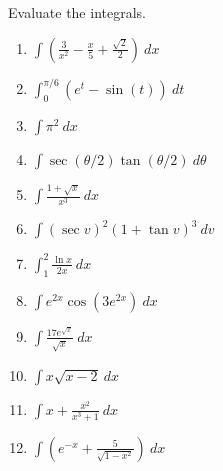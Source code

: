 \documentclass[12pt]{article}
\newcommand{\ds}{\displaystyle}
\begin{document}
Evaluate the integrals. %
\begin{enumerate}
\item $\ds \int \left(\frac{3}{x^2}-\frac{x}{5}+\frac{\sqrt{2}}{2} \right) \ dx $ \vfill
\item $\ds \int_0^{\pi/6} \left(e^t-\sin(t)\right) \ dt $ \vfill
\item $\ds \int \pi^2 \ dx $\vfill
\newpage
\item $\ds \int \sec(\theta/2) \tan(\theta/2)\ d\theta $\vfill
\item $\ds \int \frac{1+\sqrt{x}}{x^3}\ dx $\vfill
\item $\ds \int (\sec v)^{2} (1+\tan{v})^3\ dv $ \vfill

\newpage
\item $\ds \int_1^2 \frac{\ln x}{2x}\ dx $ \vfill
\item $\ds \int e^{2x}\cos(3e^{2x})\ dx $ \vfill
\item $\ds \int  \frac{17e^{\sqrt{x}}}{\sqrt{x}} \ dx $  \vfill
\newpage
\item $\ds \int x\sqrt{x-2}\ dx $ \vfill
\item $\ds \int x+ \frac{x^2}{x^3+1}\ dx $ \vfill
\item $\ds \int \left( e^{-x}+\frac{5}{\sqrt{1-x^2}} \right)\ dx $ \vfill




\end{enumerate}
\end{document}
